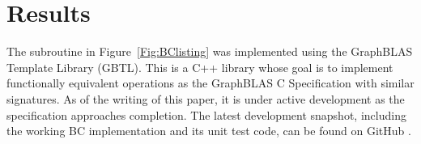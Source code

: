 \section{Results}
\label{sec:results}

The subroutine in Figure~\ref{Fig:BClisting} was implemented using the
GraphBLAS Template Library (GBTL)\cite{gbtl-cuda16}. This is a C++ library whose
goal is to implement functionally equivalent operations as the GraphBLAS C
Specification with similar signatures.  As of the writing of this paper, it is 
under active development as the specification approaches 
completion.  The latest development snapshot, including the working BC 
implementation and its unit test code, can be found on GitHub \cite{gbtl-github}.  

